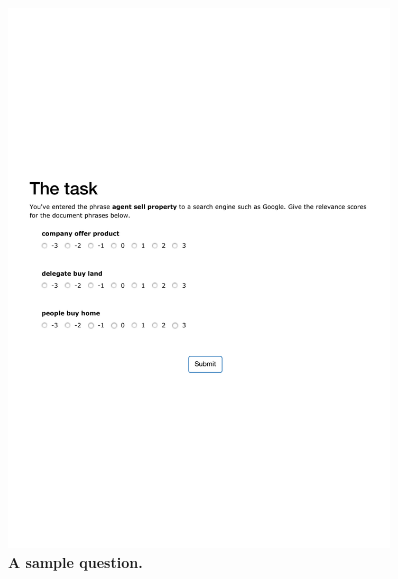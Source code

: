 \begin{figure}
\centering
\includegraphics[width=0.9\textwidth]{figures/task}

\caption{\textbf{A sample question.}}

\label{fig:task}
\end{figure}

